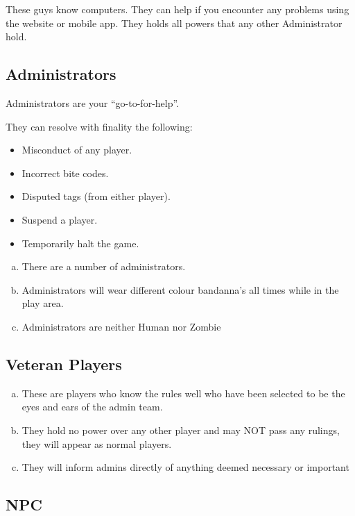 \documentclass[a4paper,12pt]{article}
\begin{document}
These guys know computers. They can help if you encounter any problems using the website or mobile app.
They holds all powers that any other Administrator hold.

\subsection{Administrators}

Administrators are your ``go-to-for-help''.

They can resolve with finality the following:

\begin{itemize}
    \item {Misconduct of any player.}
    \item {Incorrect bite codes.}
    \item {Disputed tags (from either player).}
    \item {Suspend a player.}
    \item {Temporarily halt the game.}
\end{itemize}

\begin{enumerate}[(a)]
    \item There are a number of administrators.
    \item Administrators will wear different colour bandanna's all times while in the play area.
    \item Administrators are neither Human nor Zombie
\end{enumerate}

\subsection{Veteran Players}

\begin{enumerate}[(a)]
    \item These are players who know the rules well who have been selected to be the eyes and ears of the admin team.
    \item They hold no power over any other player and may NOT pass any rulings, they will appear as normal players.
    \item They will inform admins directly of anything deemed necessary or important
\end{enumerate}

\subsection{NPC}
\end{document}
